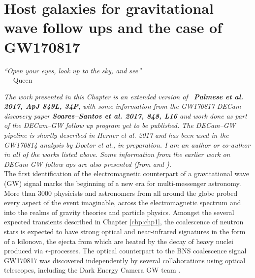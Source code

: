 \chapter{Host galaxies for gravitational wave follow ups and the case of GW170817}\label{chp:chp3}

\begin{flushright}
  {\em ``Open your eyes, look up to the sky, and see''}\\
\ \
\normalsize
{Queen}  
\end{flushright}

\noindent \emph{The work presented in this Chapter is an extended version of ~{\bf Palmese et al. 2017, ApJ 849L, 34P}, with some information from the GW170817 DECam discovery paper {\bf Soares--Santos et al. 2017, 848, L16} and work done as part of the DECam--GW follow up program yet to be published. The DECam--GW pipeline is shortly described in Herner et al. 2017 and has been used in the GW170814 analysis by Doctor et al., in preparation. I am an author or co-author in all of the works listed above. Some information from the earlier work on DECam GW follow ups are also presented (from \citealt{marcelle16} and \citealt{Cowperthwaite16}). }\\

\noindent The first identification of the electromagnetic counterpart \citep{MMApaper} of a gravitational wave (GW) signal \citep{ligobns} marks the beginning of a new era for multi-messenger astronomy. More than 3000 physicists and astronomers from all around the globe probed every aspect of the event imaginable, across the electromagnetic spectrum and into the realms of gravity theories and particle physics. Amongst the several expected transients described in Chapter \ref{chp:chp1}, the coalescence of neutron stars is expected to have strong optical and near-infrared signatures in the form of a kilonova, the ejecta from which are heated by the decay of heavy nuclei produced via $r$-processes. The optical counterpart to the BNS coalescence signal GW170817 was discovered independently by several collaborations using optical telescopes, including the Dark Energy Camera GW team \citep{marcelle17}. 

